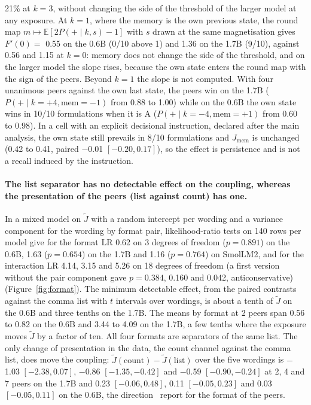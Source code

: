 \documentclass[11pt]{article}
\begin{document}
21\% at $k=3$, without changing the side of the threshold of the
larger model at any exposure. At $k=1$, where the memory is the own
previous state, the round map $m \mapsto \mathbb{E}[2P(+\mid k, s)-1]$ with
$s$ drawn at the same magnetisation gives $F'(0) = $ 0.55 on the 0.6B
(0/10 above 1) and 1.36 on the 1.7B (9/10), against 0.56 and
1.15 at $k=0$: memory does not change the side of the threshold,
and on the larger model the slope rises, because the own state enters the
round map with the sign of the peers. Beyond $k=1$ the slope is not
computed. With four unanimous peers against the own last state, the peers
win on the 1.7B ($P(+\mid k=+4, \text{mem}=-1)$ from 0.88 to 1.00)
while on the 0.6B the own state wins in 10/10 formulations when it is A
($P(+\mid k=-4, \text{mem}=+1)$ from 0.60 to 0.98). In a cell with an explicit decisional instruction, declared after the main analysis, the own state still prevails in 8/10 formulations and $J_{\text{mem}}$ is unchanged (0.42 to 0.41,
paired $-$0.01 $[-0.20, 0.17]$), so the effect is persistence and is not a recall induced by the instruction.

\paragraph{The list separator has no detectable effect on the coupling, whereas the presentation of the peers (list against count) has one.} In a mixed model on $\tilde J$ with a random intercept per wording and a
variance component for the wording by format pair, likelihood-ratio tests
on 140 rows per model give for the format LR 0.62 on 3 degrees of
freedom ($p = 0.891$) on the 0.6B, 1.63 ($p = 0.654$) on the 1.7B and
1.16 ($p = 0.764$) on SmolLM2, and for the interaction LR 4.14, 3.15
and 5.26 on 18 degrees of freedom (a first version without the pair
component gave $p = 0.384$, 0.160 and 0.042, anticonservative)
(Figure~\ref{fig:format}). The minimum detectable effect, from the paired
contrasts against the comma list with $t$ intervals over wordings, is
about a tenth of $\tilde J$ on the 0.6B and three tenths on the 1.7B. The means by format at 2
peers span 0.56 to 0.82 on the 0.6B and 3.44 to 4.09 on the 1.7B, a few
tenths where the exposure moves $\tilde J$ by a factor of ten. All four formats are separators of the same list. The only change of presentation in the data, the count channel against the comma list, does move the coupling: $\tilde J(\text{count}) - \tilde J(\text{list})$ over the five
wordings is $-$1.03 $[-2.38, 0.07]$, $-$0.86 $[-1.35, -0.42]$ and
$-$0.59 $[-0.90, -0.24]$ at 2, 4 and 7 peers on the 1.7B and 0.23 $[-0.06, 0.48]$,
0.11 $[-0.05, 0.23]$ and 0.03 $[-0.05, 0.11]$ on the 0.6B, the direction~\cite{cho2025}
report for the format of the peers.
\end{document}
